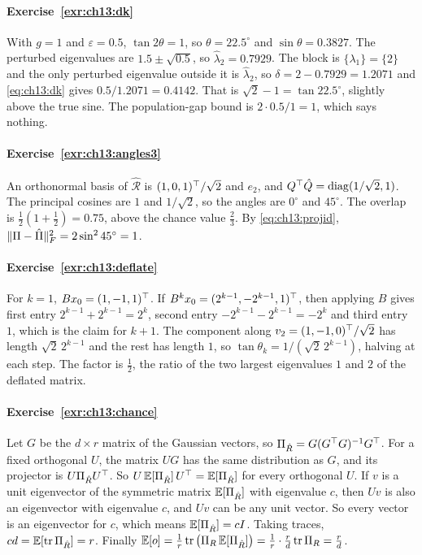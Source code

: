 \paragraph{Exercise~\ref{exr:ch13:dk}}
With $g=1$ and $\varepsilon=0.5$, $\tan2\theta=1$, so $\theta=22.5^\circ$ and
$\sin\theta=0.3827$. The perturbed eigenvalues are $1.5\pm\sqrt{0.5}$, so
$\hat\lambda_2=0.7929$. The block is $\{\lambda_1\}=\{2\}$ and the only perturbed
eigenvalue outside it is $\hat\lambda_2$, so $\delta=2-0.7929=1.2071$ and
\cref{eq:ch13:dk} gives $0.5/1.2071=0.4142$. That is $\sqrt2-1=\tan22.5^\circ$,
slightly above the true sine. The population-gap bound is $2\cdot0.5/1=1$, which
says nothing.

\paragraph{Exercise~\ref{exr:ch13:angles3}}
An orthonormal basis of $\hat{\mathcal R}$ is $(1,0,1)^{\top}/\sqrt2$ and $e_2$, and
$Q^{\top}\hat Q=\operatorname{diag}(1/\sqrt2,1)$. The principal cosines are $1$ and $1/\sqrt2$, so the
angles are $0^\circ$ and $45^\circ$. The overlap is $\tfrac12(1+\tfrac12)=0.75$,
above the chance value $\tfrac23$. By \cref{eq:ch13:projid},
$\lVert \Pi-\hat\Pi\rVert_F^2=2\sin^245^\circ=1$.

\paragraph{Exercise~\ref{exr:ch13:deflate}}
For $k=1$, $Bx_0=(1,-1,1)^{\top}$. If $B^kx_0=(2^{k-1},-2^{k-1},1)^{\top}$, then applying $B$
gives first entry $2^{k-1}+2^{k-1}=2^k$, second entry $-2^{k-1}-2^{k-1}=-2^k$ and
third entry $1$, which is the claim for $k+1$. The component along
$v_2=(1,-1,0)^{\top}/\sqrt2$ has length $\sqrt2\,2^{k-1}$ and the rest has length $1$, so
$\tan\theta_k=1/(\sqrt2\,2^{k-1})$, halving at each step. The factor is $\tfrac12$, the ratio of the two largest
eigenvalues $1$ and $2$ of the deflated matrix.

\paragraph{Exercise~\ref{exr:ch13:chance}}
Let $G$ be the $d\times r$ matrix of the Gaussian vectors, so
$\Pi_{\hat R}=G(G^{\top} G)^{-1}G^{\top}$. For a fixed orthogonal $U$, the matrix $UG$ has the
same distribution as $G$, and its projector is $U\Pi_{\hat R}U^{\top}$. So
$U\,\mathbb{E}[\Pi_{\hat R}]\,U^{\top}=\mathbb{E}[\Pi_{\hat R}]$ for every orthogonal $U$. If $v$ is a unit
eigenvector of the symmetric matrix $\mathbb{E}[\Pi_{\hat R}]$ with eigenvalue $c$, then $Uv$
is also an eigenvector with eigenvalue $c$, and $Uv$ can be any unit vector. So every
vector is an eigenvector for $c$, which means $\mathbb{E}[\Pi_{\hat R}]=cI$. Taking traces,
$cd=\mathbb{E}[\operatorname{tr}\Pi_{\hat R}]=r$. Finally
$\mathbb{E}[o]=\tfrac1r\operatorname{tr}\big(\Pi_R\,\mathbb{E}[\Pi_{\hat R}]\big)=\tfrac1r\cdot\tfrac rd\operatorname{tr}\Pi_R=\tfrac rd$.
